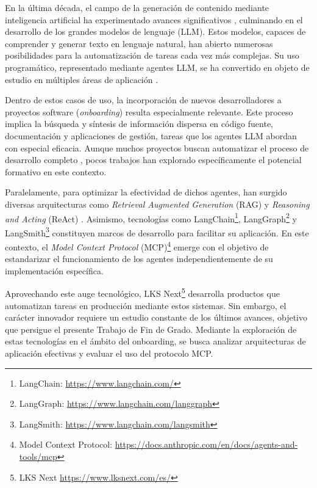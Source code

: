 En la última década, el campo de la generación de contenido mediante inteligencia artificial ha experimentado avances significativos \cite{vaswani_attention_2023}, culminando en el desarrollo de los grandes modelos de lenguaje (LLM). Estos modelos, capaces de comprender y generar texto en lenguaje natural, han abierto numerosas posibilidades para la automatización de tareas cada vez más complejas. Su uso programático, representado mediante agentes LLM, se ha convertido en objeto de estudio en múltiples áreas de aplicación \cite{noauthor_design_nodate, singh_exploring_2023, dong_self-collaboration_2024}.

Dentro de estos casos de uso, la incorporación de nuevos desarrolladores a proyectos software (\textit{onboarding}) resulta especialmente relevante. Este proceso implica la búsqueda y síntesis de información dispersa en código fuente, documentación y aplicaciones de gestión, tareas que los agentes LLM abordan con especial eficacia. Aunque muchos proyectos buscan automatizar el proceso de desarrollo completo \cite{qian_chatdev_2024, acharya_devin_2025, noauthor_aider-aiaider_2025}, pocos trabajos han explorado específicamente el potencial formativo en este contexto.

Paralelamente, para optimizar la efectividad de dichos agentes, han surgido diversas arquitecturas como \textit{Retrieval Augmented Generation} (RAG) \cite{gao_retrieval-augmented_2024} y \textit{Reasoning and Acting} (ReAct) \cite{yao_react_2023}. Asimismo, tecnologías como LangChain\footnote{LangChain: \url{https://www.langchain.com/}}, LangGraph\footnote{LangGraph: \url{https://www.langchain.com/langgraph}} y LangSmith\footnote{LangSmith: \url{https://www.langchain.com/langsmith}} constituyen marcos de desarrollo para facilitar su aplicación. En este contexto, el \textit{Model Context Protocol} (MCP)\footnote{Model Context Protocol: \url{https://docs.anthropic.com/en/docs/agents-and-tools/mcp}} emerge con el objetivo de estandarizar el funcionamiento de los agentes independientemente de su implementación específica.


Aprovechando este auge tecnológico, LKS Next\footnote{LKS Next \url{https://www.lksnext.com/es/}} desarrolla productos que automatizan tareas en producción mediante estos sistemas. Sin embargo, el carácter innovador requiere un estudio constante de los últimos avances, objetivo que persigue el presente Trabajo de Fin de Grado. Mediante la exploración de estas tecnologías en el ámbito del onboarding, se busca analizar arquitecturas de aplicación efectivas y evaluar el uso del protocolo MCP.

